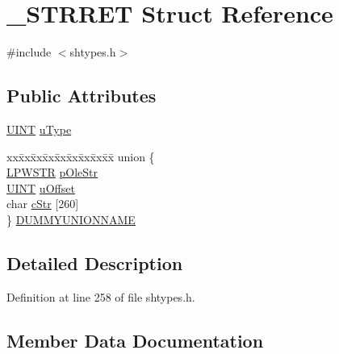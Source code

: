 \hypertarget{struct___s_t_r_r_e_t}{}\section{\+\_\+\+S\+T\+R\+R\+ET Struct Reference}
\label{struct___s_t_r_r_e_t}


{\ttfamily \#include $<$shtypes.\+h$>$}

\subsection*{Public Attributes}
\begin{DoxyCompactItemize}
\item 
\hyperlink{mapinls_8h_a36cb3b01d81ffd844bbbfb54003e06ec}{U\+I\+NT} \hyperlink{struct___s_t_r_r_e_t_a174dec7ee79f84d4082df2e09941913d}{u\+Type}
\item 
\begin{tabbing}
xx\=xx\=xx\=xx\=xx\=xx\=xx\=xx\=xx\=\kill
union \{\\
\>\hyperlink{mapinls_8h_acc28f72b93422cfd63a60e5a102a77b1}{LPWSTR} \hyperlink{struct___s_t_r_r_e_t_a59bd1cc8e0ca27db45ebcbf56df47a9f}{pOleStr}\\
\>\hyperlink{mapinls_8h_a36cb3b01d81ffd844bbbfb54003e06ec}{UINT} \hyperlink{struct___s_t_r_r_e_t_a8a7b1ee859627c50194532b63f604972}{uOffset}\\
\>char \hyperlink{struct___s_t_r_r_e_t_a57660bf5e69abd73ac6cd3026bae8a5c}{cStr} \mbox{[}260\mbox{]}\\
\} \hyperlink{struct___s_t_r_r_e_t_a5fcf27241ecb01de8d7d85a6784dbbfc}{DUMMYUNIONNAME}\\

\end{tabbing}\end{DoxyCompactItemize}


\subsection{Detailed Description}


Definition at line 258 of file shtypes.\+h.



\subsection{Member Data Documentation}
